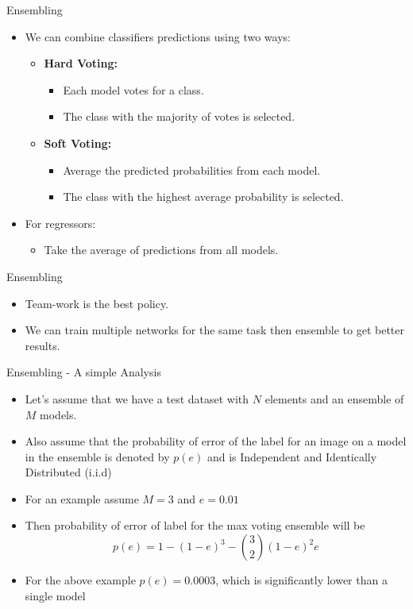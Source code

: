 \begin{frame}{Ensembling}
\begin{itemize}
\item We can combine classifiers predictions using two ways:
\begin{itemize}
    \item \textbf{Hard Voting:}
    \begin{itemize}
        \item Each model votes for a class.
        \item The class with the majority of votes is selected.
    \end{itemize}
    \item \textbf{Soft Voting:}
    \begin{itemize}
        \item Average the predicted probabilities from each model.
        \item The class with the highest average probability is selected.
    \end{itemize}
\end{itemize}
\end{itemize}
\begin{itemize}
\item For regressors:
    \begin{itemize}
        \item Take the average of predictions from all models.
        \end{itemize}
\end{itemize}
\end{frame}

\begin{frame}{Ensembling}
    \begin{itemize}
        \item Team-work is the best policy.
        \item We can train multiple networks for the same task then ensemble to get better results.
    \end{itemize}
\end{frame}

\begin{frame}{Ensembling - A simple Analysis}
    \begin{itemize}
        \item Let's assume that we have a test dataset with $N$ elements and an ensemble of $M$ models.
        \item Also assume that the probability of error of the label for an image on a model in the ensemble is denoted by $p(e)$ and is Independent and Identically Distributed (i.i.d)
        \item For an example assume $M=3$ and $e =0.01$
        \item Then probability of error of label for the max voting ensemble will be
        $$p(e) = 1 - (1-e)^3 - \binom 32 (1-e)^2 e$$
        \item For the above example $p(e)=0.0003$, which is significantly lower than a single model
    \end{itemize}
\end{frame} 